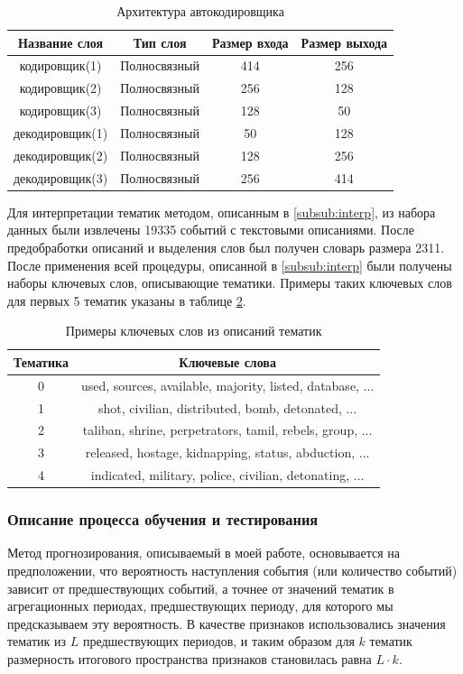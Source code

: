 \begin{table}
\centering
 \begin{tabular}{| c | c | c | c |} 
 \hline
 Название слоя & Тип слоя & Размер входа & Размер выхода \\
 \hline
 \hline
 кодировщик(1) & Полносвязный & 414 & 256 \\ 
 \hline
 кодировщик(2) & Полносвязный & 256 & 128 \\ 
 \hline
 кодировщик(3) & Полносвязный & 128 & 50 \\ 
 \hline
 декодировщик(1) & Полносвязный & 50 & 128 \\ 
 \hline
 декодировщик(2) & Полносвязный & 128 & 256 \\ 
 \hline
 декодировщик(3) & Полносвязный & 256 & 414 \\ 
 \hline
\end{tabular}
\caption{Архитектура автокодировщика}
\label{table:ae_arch}
\end{table}

Для интерпретации тематик методом, описанным в \ref{subsub:interp}, из набора данных были извлечены 19335 событий с текстовыми описаниями. После предобработки описаний и выделения слов был получен словарь размера 2311. После применения всей процедуры, описанной в \ref{subsub:interp} были получены наборы ключевых слов, описывающие тематики. Примеры таких ключевых слов для первых 5 тематик указаны в таблице \ref{table:kw_example}.

\begin{table}
\centering
 \begin{tabular}{c c} 
 \hline
 Тематика & Ключевые слова\\ 
 \hline
 \hline
 0 & used, sources, available, majority, listed, database, ...\\
 \hline
 1 & shot, civilian, distributed, bomb, detonated, ...\\
 \hline
 2 & taliban, shrine, perpetrators, tamil, rebels, group, ...\\
 \hline
 3 & released, hostage, kidnapping, status, abduction, ...\\
 \hline
 4 & indicated, military, police, civilian, detonating, ...\\
 \hline
 \end{tabular}
\caption{Примеры ключевых слов из описаний тематик }
\label{table:kw_example}
\end{table}


\subsubsection{Описание процесса обучения и тестирования} \label{train_process}
Метод прогнозирования, описываемый в моей работе, основывается на предположении, что вероятность наступления события (или количество событий) зависит от предшествующих событий, а точнее от значений тематик в агрегационных периодах, предшествующих периоду, для которого мы предсказываем эту вероятность.
В качестве признаков использовались значения тематик из $L$ предшествующих периодов, и таким образом для $k$ тематик размерность итогового пространства признаков становилась равна $L \cdot k$.

